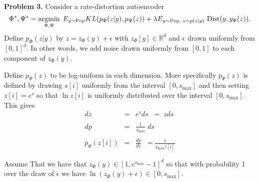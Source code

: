\documentclass{article}
\newcommand{\solution}[1]{}
\begin{document}
\solution{
  
\begin{eqnarray*}
 & & I_\Phi(y,z) \\
 \\
 & = & E_{y \sim \pop}\; KL(p_\Phi(z|y),p_\Phi(z)) \\
\\
& = & E_{y,z\sim P_\Phi(z|y)}\; \left(\ln \frac{p_\Phi(z|y)}{{\color{red} q(z)}} + \ln \frac{{\color{red} q(z)}}{p_\Phi(z)}\right) \\
\\
& = & E_{y \sim \pop}\;KL(p_\Phi(z|y),q(z)) + \left(E_{y \sim \pop,\;z\sim p_\Phi(z|y)}\;\ln \frac{q(z)}{p_\Phi(z)}\right)
\\
& = & E_y\;KL(p_\Phi(z|y),q(z)) + E_{\color{red} z\sim p_\Phi(z)}\;\ln \frac{q(z)}{p_\Phi(z)} \\
\\
& = & E_y\;KL(p_\Phi(z|y),q(z)) - KL(p_\Phi(z),q(z)) \\
\\
& \leq & E_{y \sim \pop}\; KL(p_\Phi(z|y),q(z))
\end{eqnarray*}

From part (a) equality is achieved when $q(z) = p_\Phi(z)$.
}

\bigskip
{\bf Problem 3.}
Consider a rate-distortion autoencoder
$$\Phi^*,\Psi^*  = \operatorname*{argmin}_{\Phi,\Psi}\;E_{y \sim \mathrm{Pop}} KL(p_\Phi(z|y),p_\Psi(z)) + \lambda E_{y \sim \mathrm{Pop},\;z \sim p(z|y)}\;\mathrm{Dist}(y,y_\Phi(z)).$$
Define $p_\Phi(z|y)$ by $z = z_\Phi(y) + \epsilon$ with $z_\Phi[y] \in \mathbb{R}^d$
and $\epsilon$ drawn uniformly from $[0,1]^d$. In other words,
we add noise drawn uniformly from $[0,1]$ to each component of $z_\Phi(y)$.

\medskip
Define $p_\Psi(z)$ to be log-uniform in each dimension.  More specifically
$p_\Psi(z)$ is defined by drawing $s[i]$ uniformly from the interval
$[0,s_{\mathrm{max}}]$ and then setting $z[i] = e^s$ so that $\ln z[i]$ is uniformly distributed over the interval $[0,s_{\mathrm{max}}]$.
This gives
\begin{eqnarray*}
  dz & = & e^sds  \;\;= \;zds\\
  \\
  dp & = & \frac{1}{s_{\mathrm{max}}}\;ds \\
  \\
  p_\Psi(z[i]) & = & \frac{dp}{dz} \;\;= \frac{1}{s_{\mathrm{max}}z[i]}
\end{eqnarray*}

\medskip
Assume That we have that $z_\Phi(y) \in [1,e^{s_{\mathrm{max}}}-1]^d$ so that with probability 1 over the draw of $\epsilon$ we have
$\ln(z_\Phi(y) + \epsilon) \in [0,s_{\mathrm{max}}]$.
\end{document}
